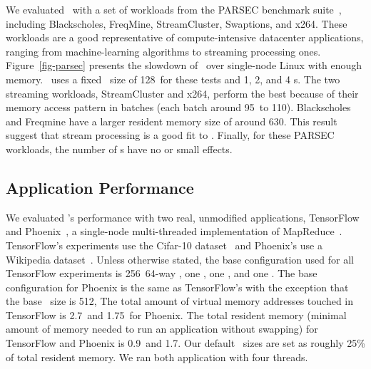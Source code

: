 \documentclass[10pt,times,twocolumn]{z2-article}
\begin{document}
{{{{{{{
We evaluated \lego\ with a set of workloads from the PARSEC benchmark suite~\cite{PARSEC},
including Blackscholes, FreqMine, StreamCluster, Swaptions, and x264.
These workloads are a good representative of compute-intensive datacenter applications, 
ranging from machine-learning algorithms to streaming processing ones.
Figure~\ref{fig-parsec} presents the slowdown of \lego\ 
over single-node Linux with enough memory.
\lego\ uses a fixed \excache\ size of 128\MB\ for these tests and 1, 2, and 4 \mcomponent s.
The two streaming workloads, StreamCluster and x264, perform the best because of their 
memory access pattern in batches (each batch around 95\MB\ to 110\MB).
Blackscholes and Freqmine have a larger resident memory size of around 630\MB.
This result suggest that stream processing is a good fit to \lego.
Finally, for these PARSEC workloads, the number of \mcomponent s have no or small effects.

\fi

\subsection{Application Performance}
\label{sec:appresults}
We evaluated \lego's performance with two real, unmodified applications, 
TensorFlow~\cite{TensorFlow} and Phoenix~\cite{Ranger07-HPCA}, a single-node multi-threaded implementation of MapReduce~\cite{DeanEtAl04-MapReduce}.
TensorFlow's experiments use the Cifar-10 dataset~\cite{CIFAR-DS} and Phoenix's use a Wikipedia dataset~\cite{Wiki-DS}.
Unless otherwise stated, the base configuration used for all TensorFlow experiments
is 256\MB\ 64-way \excache, one \pcomponent, one \mcomponent, and one \scomponent.
The base configuration for Phoenix is the same as TensorFlow's with the exception that the base \excache\ size is 512\MB,
The total amount of virtual memory addresses touched in TensorFlow is 2.7\GB\ and 1.75\GB\ for Phoenix.
The total resident memory (minimal amount of memory needed to run an application without swapping) 
for TensorFlow and Phoenix is 0.9\GB\ and 1.7\GB.
Our default \excache\ sizes are set as roughly 25\% of total resident memory.
We ran both application with four threads.

}}}}}}}
\end{document}
